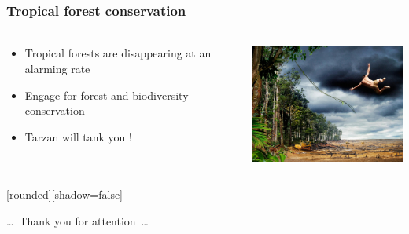 \documentclass[slidetop,10pt,dvipsnames,leqno,fleqn]{beamer} %
\begin{document}
\begin{frame}
  \frametitle{Tropical forest conservation}
  \framesubtitle{}
  \begin{columns}[c]
    \begin{column}{0.4\textwidth}
        \begin{itemize}
        \item Tropical forests are disappearing at an alarming rate
        \item Engage for forest and biodiversity conservation
        \item Tarzan will tank you !
        \end{itemize}
    \end{column}
    \begin{column}{0.6\textwidth}
      \centering \includegraphics[width=6cm]{./Figures/tarzan.jpg}
    \end{column}
  \end{columns}
\end{frame}


{
  [rounded][shadow=false]

  \begin{frame}[plain]
    \begin{block}{}
      \begin{center}
        \ldots~Thank you for attention~\ldots
      \end{center}
    \end{block}
  \end{frame}
}
\end{document}
